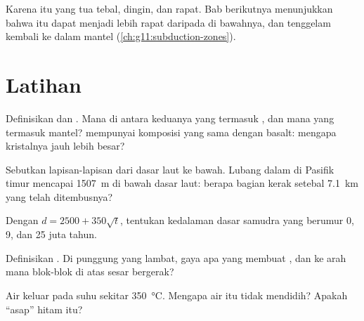 Karena itu  yang tua tebal, dingin, dan rapat. Bab berikutnya
menunjukkan bahwa  itu dapat menjadi lebih rapat daripada  di
bawahnya, dan tenggelam kembali ke dalam mantel (\cref{ch:g11:subduction-zones}).

\section{Latihan}

\begin{exercise}[$\star$]\label{exo:g11:ocean-ridges:1}
Definisikan  dan . Mana di antara keduanya yang termasuk , dan mana yang termasuk mantel?  mempunyai komposisi yang sama
dengan basalt: mengapa kristalnya jauh lebih besar?
\end{exercise}

\begin{exercise}[$\star$]\label{exo:g11:ocean-ridges:2}
Sebutkan lapisan-lapisan  dari dasar laut ke bawah. Lubang dalam
di Pasifik timur mencapai \qty{1507}{m} di bawah dasar laut: berapa bagian kerak
setebal \qty{7.1}{km} yang telah ditembusnya?
\end{exercise}

\begin{exercise}[$\star$]\label{exo:g11:ocean-ridges:3}
Dengan $d = 2500 + 350\sqrt{t}$, tentukan kedalaman dasar samudra yang berumur
0, 9, dan 25 juta tahun.
\end{exercise}

\begin{exercise}[$\star$]\label{exo:g11:ocean-ridges:4}
Definisikan . Di punggung yang lambat, gaya apa yang membuat , dan ke arah mana blok-blok di atas sesar bergerak?
\end{exercise}

\begin{exercise}[$\star$]\label{exo:g11:ocean-ridges:5}
Air  keluar pada suhu sekitar \qty{350}{\celsius}. Mengapa air itu
tidak mendidih? Apakah ``asap'' hitam itu?
\end{exercise}

